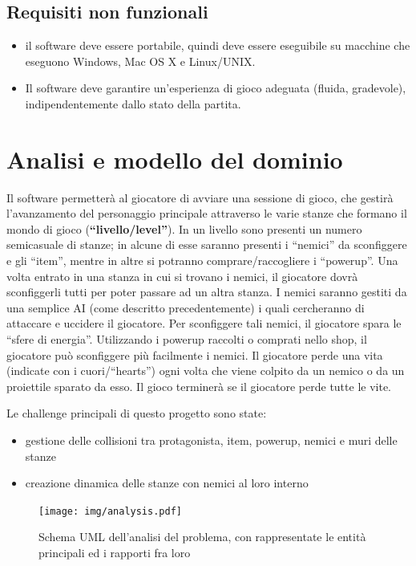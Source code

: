 \documentclass[a4paper,12pt]{report}
\begin{document}
\subsection*{Requisiti non funzionali}
\begin{itemize}
    \item il software deve essere portabile, quindi deve essere eseguibile su macchine che eseguono Windows, Mac OS X e Linux/UNIX.
    \item Il software deve garantire un'esperienza di gioco adeguata (fluida, gradevole), indipendentemente dallo stato della partita.
\end{itemize}

\newpage
\section{Analisi e modello del dominio}
Il software permetterà al giocatore di avviare una sessione di gioco, che gestirà l'avanzamento del personaggio principale attraverso le varie stanze che formano il mondo di gioco (\textbf{``livello/level''}).
In un livello sono presenti un numero semicasuale di stanze; in alcune di esse saranno presenti i ``nemici'' da sconfiggere e gli ``item'', mentre in altre si potranno comprare/raccogliere i ``powerup''.
Una volta entrato in una stanza in cui si trovano i nemici, il giocatore dovrà sconfiggerli tutti per poter passare ad un altra stanza.
I nemici saranno gestiti da una semplice AI (come descritto precedentemente) i quali cercheranno di attaccare e uccidere il giocatore. 
Per sconfiggere tali nemici, il giocatore spara le ``sfere di energia''. 
Utilizzando i powerup raccolti o comprati nello shop, il giocatore può sconfiggere più facilmente i nemici. 
Il giocatore perde una vita (indicate con i cuori/``hearts'') ogni volta che viene colpito da un nemico o da un proiettile sparato da esso.
Il gioco terminerà se il giocatore perde tutte le vite.

Le challenge principali di questo progetto sono state:
\begin{itemize}
    \item gestione delle collisioni tra protagonista, item, powerup, nemici e muri delle stanze
    \item creazione dinamica delle stanze con nemici al loro interno
\end{itemize}

\begin{figure}[H]
    \centering{}
    \texttt{[image: img/analysis.pdf]}
    \caption{Schema UML dell'analisi del problema, con rappresentate le entità principali ed i rapporti fra loro}
    \label{img:analysis}
\end{figure}
\end{document}
